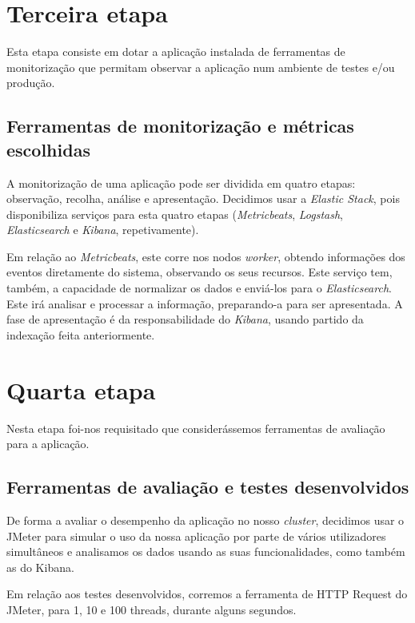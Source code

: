 \documentclass[11pt]{article}
\begin{document}
\section{Terceira etapa}

Esta etapa consiste em dotar a aplicação instalada de ferramentas de monitorização que permitam observar a aplicação num ambiente de testes e/ou produção.

\subsection{Ferramentas de monitorização e métricas escolhidas}

A monitorização de uma aplicação pode ser dividida em quatro etapas: observação, recolha, análise e apresentação. Decidimos usar a \textit{Elastic Stack}, pois disponibiliza serviços para esta quatro etapas (\textit{Metricbeats}, \textit{Logstash}, \textit{Elasticsearch} e \textit{Kibana}, repetivamente).

Em relação ao \textit{Metricbeats}, este corre nos nodos \textit{worker}, obtendo informações dos eventos diretamente do sistema, observando os seus recursos. Este serviço tem, também, a capacidade de normalizar os dados e enviá-los para o \textit{Elasticsearch}. Este irá analisar e processar a informação, preparando-a para ser apresentada. A fase de apresentação é da responsabilidade do \textit{Kibana}, usando partido da indexação feita anteriormente.


\section{Quarta etapa}

Nesta etapa foi-nos requisitado que considerássemos ferramentas de avaliação para a aplicação.

\subsection{Ferramentas de avaliação e testes desenvolvidos}

De forma a avaliar o desempenho da aplicação no nosso \textit{cluster}, decidimos usar o JMeter para simular o uso da nossa aplicação por parte de vários utilizadores simultâneos e analisamos os dados usando as suas funcionalidades, como também as do Kibana.

Em relação aos testes desenvolvidos, corremos a ferramenta de HTTP Request do JMeter, para 1, 10 e 100 threads, durante alguns segundos.
\end{document}
